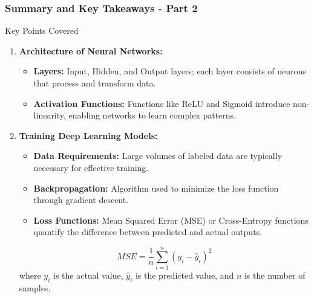 \documentclass[aspectratio=169]{beamer}
\begin{document}
\begin{frame}[fragile]
    \frametitle{Summary and Key Takeaways - Part 2}
    \begin{block}{Key Points Covered}
        \begin{enumerate}
            \item \textbf{Architecture of Neural Networks:}
                \begin{itemize}
                    \item \textbf{Layers:} Input, Hidden, and Output layers; each layer consists of neurons that process and transform data.
                    \item \textbf{Activation Functions:} Functions like ReLU and Sigmoid introduce non-linearity, enabling networks to learn complex patterns.
                \end{itemize}

            \item \textbf{Training Deep Learning Models:}
                \begin{itemize}
                    \item \textbf{Data Requirements:} Large volumes of labeled data are typically necessary for effective training.
                    \item \textbf{Backpropagation:} Algorithm used to minimize the loss function through gradient descent.
                    \item \textbf{Loss Functions:} Mean Squared Error (MSE) or Cross-Entropy functions quantify the difference between predicted and actual outputs.
                \end{itemize}

                \begin{equation}
                    MSE = \frac{1}{n} \sum_{i=1}^{n} (y_i - \hat{y}_i)^2
                \end{equation}
                where $y_i$ is the actual value, $\hat{y}_i$ is the predicted value, and $n$ is the number of samples.
        \end{enumerate}
    \end{block}
\end{frame}
\end{document}
